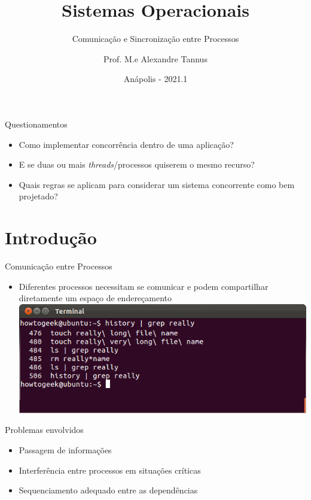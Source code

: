 \documentclass[aspectratio=169,
				xcolor=table]{beamer}
\institute[]{\uppercase{Engenharia de Software}}
\title[]{Sistemas Operacionais}
\subtitle[]{Comunicação e Sincronização entre Processos }
\author[]{Prof. M.e Alexandre Tannus}
\date{Anápolis - 2021.1}
\begin{document}
	\begin{frame}
		\titlepage
	\end{frame}

	\begin{frame}
		\tableofcontents
	\end{frame}	
	
	
	\begin{frame}{Questionamentos}
		\begin{itemize}
			\item Como implementar concorrência dentro de uma aplicação?
			\vspace{1em}
			\item E se duas ou mais \textit{threads}/processos quiserem o mesmo recurso?
			\vspace{1em}
			\item Quais regras se aplicam para considerar um sistema concorrente como bem projetado?
		\end{itemize}
	\end{frame}

	\section{Introdução}
	\begin{frame}{Comunicação entre Processos}
		\begin{itemize}
			\item Diferentes processos necessitam se comunicar e podem compartilhar diretamente um espaço de endereçamento
			\vspace{1em}
			\includegraphics[keepaspectratio, height=0.5\paperheight]{../figs/cap05/history.png} 
		\end{itemize}
	\end{frame}
	
	\begin{frame}{Problemas envolvidos}
		\begin{itemize}
			\item Passagem de informações
			\vspace{1em}
			\item Interferência entre processos em situações críticas
			\vspace{1em}
			\item Sequenciamento adequado entre as dependências
		\end{itemize}
	\end{frame}
	
\end{document}
